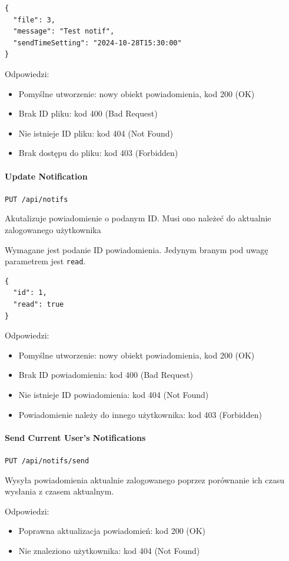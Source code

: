 \documentclass[a4paper,twoside,12pt]{book}
\begin{document}
\begin{verbatim}
{
  "file": 3,
  "message": "Test notif",
  "sendTimeSetting": "2024-10-28T15:30:00"
}
\end{verbatim}

Odpowiedzi: 
\begin{itemize}
	\item Pomyślne utworzenie: nowy obiekt powiadomienia, kod 200 (OK) 
	\item Brak ID pliku: kod 400 (Bad Request) 
	\item Nie istnieje ID pliku: kod 404 (Not Found)
	\item Brak dostępu do pliku: kod 403 (Forbidden)
\end{itemize}

\paragraph{Update Notification}

\texttt{PUT /api/notifs}

Akutalizuje powiadomienie o podanym ID. Musi ono należeć do aktualnie zalogowanego użytkownika

Wymagane jest podanie ID powiadomienia. Jedynym branym pod uwagę parametrem jest \texttt{read}.
\begin{verbatim}
{
  "id": 1,
  "read": true
}
\end{verbatim}

Odpowiedzi: 
\begin{itemize}
	\item Pomyślne utworzenie: nowy obiekt powiadomienia, kod 200 (OK) 
	\item Brak ID powiadomienia: kod 400 (Bad Request) 
	\item Nie istnieje ID powiadomienia: kod 404 (Not Found)
	\item Powiadomienie należy do innego użytkownika: kod 403 (Forbidden)
\end{itemize}

\paragraph{Send Current User's Notifications}

\texttt{PUT /api/notifs/send}

Wysyła powiadomienia aktualnie zalogowanego poprzez porównanie ich czasu wysłania z czasem aktualnym.

Odpowiedzi: 
\begin{itemize}
	\item Poprawna aktualizacja powiadomień: kod 200 (OK) 
	\item Nie znaleziono użytkownika: kod 404 (Not Found)
\end{itemize}
\end{document}
